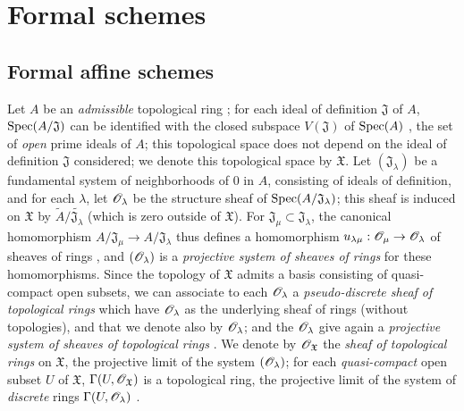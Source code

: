 \section{Formal schemes}
\label{section:1.10}

\subsection{Formal affine schemes}
\label{subsection:1.10.1}

\begin{env}[10.1.1]
\label{1.10.1.1}
Let $A$ be an \emph{admissible} topological ring ; for each ideal of definition $\mathfrak{J}$ of $A$, $\operatorname{Spec}(A/\mathfrak{J})$ can be identified with the closed subspace $V(\mathfrak{J})$ of $\operatorname{Spec}(A)$ , the set of \emph{open} prime ideals of $A$; this topological space does not depend
on the ideal of definition $\mathfrak{J}$ considered; we denote this topological space by $\mathfrak{X}$. Let $(\mathfrak{J}_\lambda)$ be a fundamental system of neighborhoods of $0$ in $A$, consisting of ideals of definition, and for each $\lambda$, let $\mathscr{O}_\lambda$ be the structure sheaf of $\operatorname{Spec}(A/\mathfrak{J}_\lambda)$; this sheaf is induced on $\mathfrak{X}$ by $\widetilde{A}/\widetilde{\mathfrak{J}_\lambda}$ (which is zero outside of $\mathfrak{X}$).
For $\mathfrak{J}_\mu\subset\mathfrak{J}_\lambda$, the canonical homomorphism $A/\mathfrak{J}_\mu\to A/\mathfrak{J}_\lambda$ thus defines a homomorphism $u_{\lambda\mu}:\sh{O}_\mu\to\sh{O}_\lambda$ of sheaves of rings , and $(\mathscr{O}_\lambda)$ is a \emph{projective system of sheaves of rings} for these homomorphisms.
Since the topology of $\mathfrak{X}$ admits a basis consisting of quasi-compact open subsets, we can associate to each $\mathscr{O}_\lambda$ a \emph{pseudo-discrete sheaf of topological rings}  which have $\mathscr{O}_\lambda$ as the underlying sheaf of rings (without topologies), and that we denote also by $\mathscr{O}_\lambda$; and the $\mathscr{O}_\lambda$ give again a \emph{projective system of sheaves of topological rings} .
We denote by $\mathscr{O}_\mathfrak{X}$ the \emph{sheaf of topological rings} on $\mathfrak{X}$, the projective limit of the system $(\mathscr{O}_\lambda)$; for each \emph{quasi-compact} open subset $U$ of $\mathfrak{X}$, $\Gamma(U,\mathscr{O}_\mathfrak{X})$ is a topological ring, the projective limit of the system of \emph{discrete} rings $\Gamma(U,\mathscr{O}_\lambda)$ .
\end{env}

